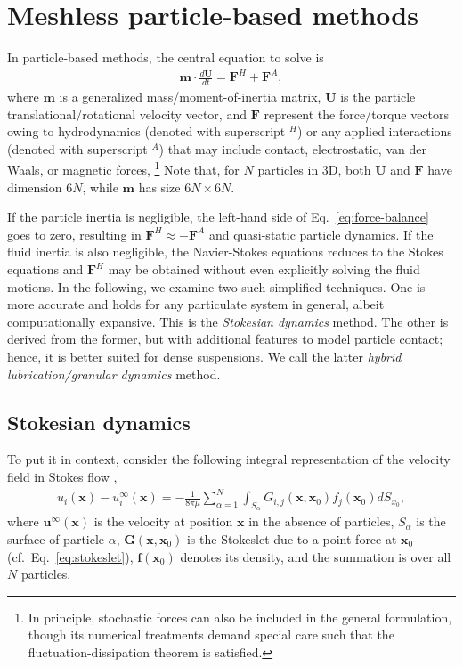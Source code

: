 \section{Meshless particle-based methods}
\label{sec:num-dem}

In particle-based methods, the central equation to solve is
\begin{equation} 
 \begin{aligned} \label{eq:force-balance}
  {\bm m} \cdot \frac{d{\bm U}}{dt} = {\bm F}^H + {\bm F}^A, 
 \end{aligned}
\end{equation}
where ${\bm m}$ is a generalized mass/moment-of-inertia matrix,
${\bm U}$ is the particle translational/rotational velocity vector,
and ${\bm F}$ represent the force/torque vectors owing to hydrodynamics (denoted with superscript $^H$) or any applied interactions (denoted with superscript $^A$) that may include contact, electrostatic, van der Waals, or magnetic forces, \etc \footnote{In principle, stochastic forces can also be included in the general formulation, though its numerical treatments demand special care such that the fluctuation-dissipation theorem is satisfied.}
Note that, for $N$ particles in 3D, both ${\bm U}$ and ${\bm F}$ have dimension $6N$, while ${\bm m}$ has size $6N \times 6N$.

If the particle inertia is negligible, the left-hand side of Eq.\ \eqref{eq:force-balance} goes to zero, resulting in $\bm{F}^H \approx -\bm{F}^A$ and quasi-static particle dynamics.
If the fluid inertia is also negligible, the Navier-Stokes equations reduces to the Stokes equations and $\bm{F}^H$ may be obtained without even explicitly solving the fluid motions.
In the following, we examine two such simplified techniques.
One is more accurate and holds for any particulate system in general, albeit computationally expansive. This is the \emph{Stokesian dynamics} method.
The other is derived from the former, but with additional features to model particle contact; hence, it is better suited for dense suspensions. We call the latter \emph{hybrid lubrication/granular dynamics} method.

\subsection{Stokesian dynamics}
\label{subsec:sd}

To put it in context, consider the following integral representation of the velocity field in Stokes flow \citep{Ladyzhenskaya},
\begin{equation} \label{eq:boundary-integral}
 \begin{aligned}
  u_i(\bm{x}) - u_i^\infty(\bm{x}) = -\frac{1}{8\pi \mu} \sum_{\alpha=1}^N  \int_{S_\alpha} G_{i,j} (\bm{x},\bm{x}_0) f_j(\bm{x}_0) dS_{x_0},
 \end{aligned}
\end{equation}
where $\bm{u}^\infty(\bm{x})$ is the velocity at position $\bm{x}$ in the absence of particles,
$S_\alpha$ is the surface of particle $\alpha$,
$\bm{G}(\bm{x},\bm{x}_0)$ is the Stokeslet due to a point force at $\bm{x}_0$ (cf.\ Eq.\ \ref{eq:stokeslet}),
$\bm f(\bm{x}_0)$ denotes its density,
and the summation is over all $N$ particles.


